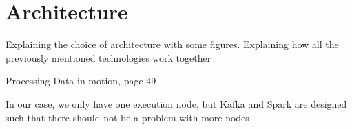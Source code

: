 \section{Architecture}
\label{sec:architecture}

Explaining the choice of architecture with some figures.
Explaining how all the previously mentioned technologies work together

Processing Data in motion, page 49

In our case, we only have one execution node, but Kafka and Spark are designed such that there should not be a problem with more nodes

